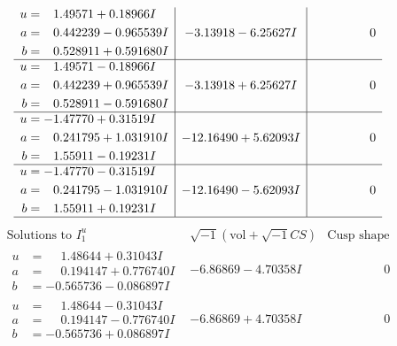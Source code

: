 \documentclass[1p]{elsarticle_modified}
\theoremstyle{definition}
\newcommand{\I}{\sqrt{-1}}
\begin{document}
$$\begin{array}{c|c|c}
\begin{aligned}
u &= \phantom{-}1.49571 + 0.18966 I \\
a &= \phantom{-}0.442239 - 0.965539 I \\
b &= \phantom{-}0.528911 + 0.591680 I\end{aligned}
 & -3.13918 - 6.25627 I & \phantom{-0.000000 } 0 \\ \hline\begin{aligned}
u &= \phantom{-}1.49571 - 0.18966 I \\
a &= \phantom{-}0.442239 + 0.965539 I \\
b &= \phantom{-}0.528911 - 0.591680 I\end{aligned}
 & -3.13918 + 6.25627 I & \phantom{-0.000000 } 0 \\ \hline\begin{aligned}
u &= -1.47770 + 0.31519 I \\
a &= \phantom{-}0.241795 + 1.031910 I \\
b &= \phantom{-}1.55911 - 0.19231 I\end{aligned}
 & -12.16490 + 5.62093 I & \phantom{-0.000000 } 0 \\ \hline\begin{aligned}
u &= -1.47770 - 0.31519 I \\
a &= \phantom{-}0.241795 - 1.031910 I \\
b &= \phantom{-}1.55911 + 0.19231 I\end{aligned}
 & -12.16490 - 5.62093 I & \phantom{-0.000000 } 0\\
 \hline 
 \end{array}$$\newpage$$\begin{array}{c|c|c}  
\text{Solutions to }I^u_{1}& \I (\text{vol} + \sqrt{-1}CS) & \text{Cusp shape}\\
 \hline 
\begin{aligned}
u &= \phantom{-}1.48644 + 0.31043 I \\
a &= \phantom{-}0.194147 + 0.776740 I \\
b &= -0.565736 - 0.086897 I\end{aligned}
 & -6.86869 - 4.70358 I & \phantom{-0.000000 } 0 \\ \hline\begin{aligned}
u &= \phantom{-}1.48644 - 0.31043 I \\
a &= \phantom{-}0.194147 - 0.776740 I \\
b &= -0.565736 + 0.086897 I\end{aligned}
 & -6.86869 + 4.70358 I & \phantom{-0.000000 } 0 \\ \hline\begin{aligned}

\end{aligned}
\end{array}$$
\end{document}
